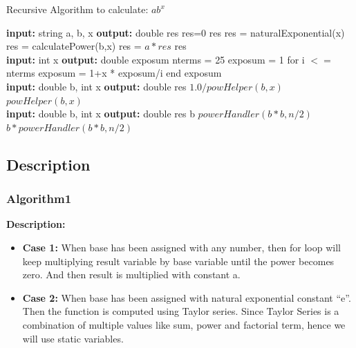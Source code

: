 \documentclass[a4paper,12pt]{report}
\begin{document}
\begin{algorithm}
\caption{Recursive Algorithm to calculate: $ab^x$ }
\begin{algorithmic}
\State \textbf{input: } string a, b, x
\State \textbf{output: } double res
\State  res=0
    \State \Return res
    \State res = naturalExponential(x)
\Else
 \State res = calculatePower(b,x)
\EndIf
\State res = $a * res$
\State \Return res
\EndProcedure
\\
\State \textbf{input: } int x
\State \textbf{output: } double exposum
\State nterms = 25
\State exposum = 1
\State for i $<=$ nterms
    \State exposum = 1+x * exposum/i
    \State end
\State \Return exposum
\EndProcedure
\\
\State \textbf{input: } double b, int x
\State \textbf{output: } double res
\State \Return $1.0/powHelper(b,x)$
   \EndIf
\State \Return $powHelper(b,x)$
\EndProcedure
\\
\State \textbf{input: } double b, int x
\State \textbf{output: } double res
\EndIf
{}
    \Return b
\EndIf
{}
\State \Return $powerHandler(b*b,  n/2)$
\Else
\State \Return $b * powerHandler(b*b,  n/2)$
\EndIf
\EndProcedure
\end{algorithmic}

\end{algorithm}

\pagebreak

\subsection{Description}

\subsubsection{Algorithm1}

\textbf{ Description: }
\begin{itemize}
    \item \textbf{Case 1:} When base has been assigned with any number, then for  loop will keep multiplying result variable by base variable until the power becomes zero. And then result is multiplied with constant a.
    \item \textbf{Case 2:} When base has been assigned with natural exponential constant “e”. Then the function is computed using Taylor series. Since Taylor Series is a combination of multiple values like sum, power and factorial term, hence we will use static variables.
\end{itemize}
\end{document}
